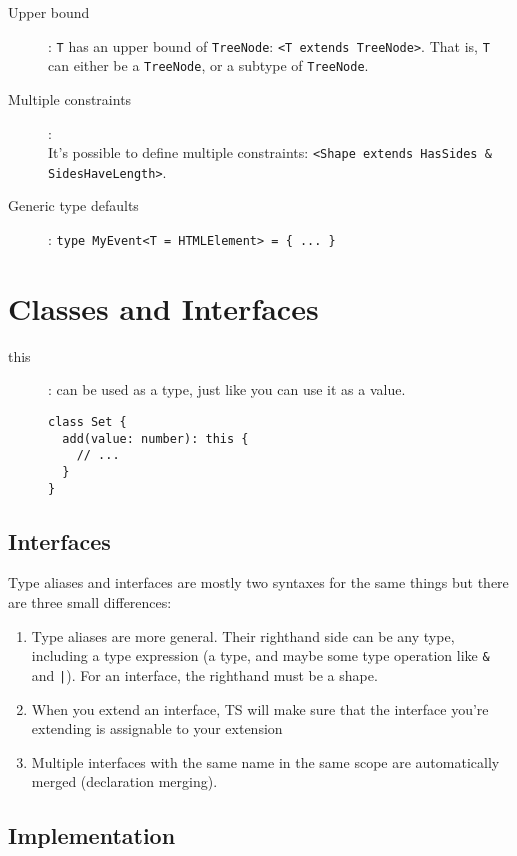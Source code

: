 \documentclass[french]{article}
\begin{document}
\begin{description}
  \item[Upper bound]: \lstinline{T} has an upper bound of \lstinline{TreeNode}: \lstinline{<T extends TreeNode>}. That is, \lstinline{T} can either be a \lstinline{TreeNode}, or a subtype of \lstinline{TreeNode}.
  \item[Multiple constraints]:\\ It's possible to define multiple constraints: \lstinline{<Shape extends HasSides & SidesHaveLength>}.
  \item[Generic type defaults]: \lstinline|type MyEvent<T = HTMLElement> = { ... }|
\end{description}

\section{Classes and Interfaces}

\begin{description}
  \item[this]: can be used as a type, just like you can use it as a value.

  \begin{lstlisting}
class Set {
  add(value: number): this {
    // ...
  }
}
  \end{lstlisting}
\end{description}

\subsection{Interfaces}

Type aliases and interfaces are mostly two syntaxes for the same things but there are three small differences:

\begin{enumerate}
  \item Type aliases are more general. Their righthand side can be any type, including a type expression (a type, and maybe some type operation like \lstinline{&} and \lstinline{|}). For an interface, the righthand must be a shape.
  \item When you extend an interface, TS will make sure that the interface you're extending is assignable to your extension
  \item Multiple interfaces with the same name in the same scope are automatically merged (declaration merging).
\end{enumerate}

\subsection{Implementation}
\end{document}
